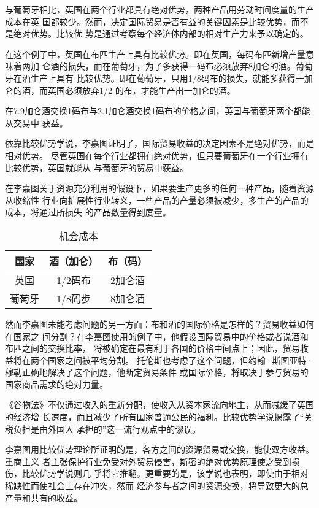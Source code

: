与葡萄牙相比，英国在两个行业都具有绝对优势，两种产品用劳动时间度量的生产成本在英
国都较少。然而，决定国际贸易是否有益的关键因素是比较优势，而不是绝对优势。比较优
势是通过考察每个经济体内部的相对生产力来予以确定的。

在这个例子中，英国在布匹生产上具有比较优势。即在英国，每码布匹新增产量意味着两加
仑酒的损失，而在葡萄牙，为了多获得一码布必须放弃8加仑的酒。葡萄牙在酒生产上具有
比较优势。即在葡萄牙，只用1/8码布的损失，就能多获得一加仑的酒，而英国必须放弃1/2
的布，才能生产出一加仑的酒。

在7.9加仑酒交换1码布与2.1加仑酒交换1码布的价格之间，英国与葡萄牙两个都能从交易中
获益。

依靠比较优势学说，李嘉图证明了，国际贸易收益的决定因素不是绝对优势，而是相对优势。
尽管英国在每个行业都拥有绝对优势，但只要葡萄牙在一个行业拥有比较优势，英国就能从
与葡萄牙的贸易中获益。

在李嘉图关于资源充分利用的假设下，如果要生产更多的任何一种产品，随着资源从收缩性
行业向扩展性行业转义，一些产品的产量必须被减少，多生产的产品的成本，将通过所损失
的产品数量得到度量。

\begin{table}[htbp]
  \centering
  \caption{机会成本}
  \label{tab:机会成本}
    \begin{tabular}{@{}ccc@{}}
      \toprule
      \textbf{国家} & \textbf{酒（加仑）} & \textbf{布（码）}   \\ \midrule
      英国 & 1/2码布 & 2加仑酒   \\
      葡萄牙& 1/8码步 &  8加仑酒  \\ \bottomrule
    \end{tabular}%
\end{table}

然而李嘉图未能考虑问题的另一方面：布和酒的国际价格是怎样的？贸易收益如何在国家之
间分割？在李嘉图使用的例子中，他假设国际贸易中的价格或者说酒和布匹之间的交换比率，
将被确定在最有利于各国的价格中间点上；因此，贸易收益将在两个国家之间被平均分割。
托伦斯也考虑了这个问题，但约翰·斯图亚特·穆勒正确地解决了这个问题，他断定贸易条件
或国际价格，将取决于参与贸易的国家商品需求的绝对力量。

《谷物法》不仅通过收入的重新分配，使收入从资本家流向地主，从而减缓了英国的经济增
长速度，而且减少了所有国家普通公民的福利。比较优势学说揭露了“关税负担是由外国人
承担的”这一流行观点中的谬误。

李嘉图用比较优势理论所证明的是，各方之间的资源贸易或交换，能使双方收益。重商主义
者主张保护行业免受对外贸易侵害，斯密的绝对优势原理使之受到损伤，比较优势学说则几
乎将它推翻。更重要的是，该学说也表明，即使由于相对稀缺性而使社会上存在冲突，然而
经济参与者之间的资源交换，将导致更大的总产量和共有的收益。

